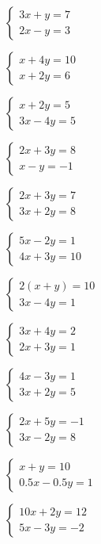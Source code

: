 \documentclass[12pt,a4paper]{article}
\begin{document}
\begin{enumerate}[label=\alph*), itemsep=1cm]
    \begin{minipage}[t]{0.45\textwidth}
    \item $\begin{cases} 3x + y = 7 \\ 2x - y = 3 \end{cases}$
    \item $\begin{cases} x + 4y = 10 \\ x + 2y = 6 \end{cases}$
    \item $\begin{cases} x + 2y = 5 \\ 3x - 4y = 5 \end{cases}$
    \item $\begin{cases} 2x + 3y = 8 \\ x - y = -1 \end{cases}$
    \item $\begin{cases} 2x + 3y = 7 \\ 3x + 2y = 8 \end{cases}$
    \item $\begin{cases} 5x - 2y = 1 \\ 4x + 3y = 10 \end{cases}$
    \end{minipage}
    \begin{minipage}[t]{0.45\textwidth}
    \item $\begin{cases} 2(x + y) = 10 \\ 3x - 4y = 1 \end{cases}$
    \item $\begin{cases} 3x + 4y = 2 \\ 2x + 3y = 1 \end{cases}$
    \item $\begin{cases} 4x - 3y = 1 \\ 3x + 2y = 5 \end{cases}$
    \item $\begin{cases} 2x + 5y = -1 \\ 3x - 2y = 8 \end{cases}$
    \item $\begin{cases} x + y = 10 \\ 0.5x - 0.5y = 1 \end{cases}$
    \item $\begin{cases} 10x + 2y = 12 \\ 5x - 3y = -2 \end{cases}$
    \end{minipage}
\end{enumerate}
\end{document}
